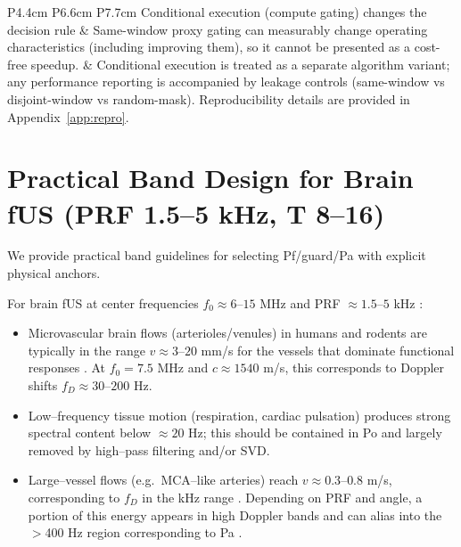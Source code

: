 \documentclass[11pt]{article}
\newif\ifSTAPPAPERONLY
\newcommand{\SuppOrApp}[1]{\ifSTAPPAPERONLY Supplementary Material\else Appendix~\ref{#1}\fi}
\begin{document}
\begin{table}[t]
{\begin{tabular}{P{4.4cm} P{6.6cm} P{7.7cm}}
Conditional execution (compute gating) changes the decision rule & Same-window proxy gating can measurably change operating characteristics (including improving them), so it cannot be presented as a cost-free speedup. & Conditional execution is treated as a separate algorithm variant; any performance reporting is accompanied by leakage controls (same-window vs disjoint-window vs random-mask). Reproducibility details are provided in \SuppOrApp{app:repro}. \\
\hline
\end{tabular}
}
\caption{Practical safeguards and audit checks. Each check is deterministic and label-free; it either records provenance/QC metrics or forces conservative penalty-layer behavior (e.g.\ $\phi_i\in\mathcal{R}_0$, $w\equiv 1$) with an explicit reason label.}
\label{tab:failure_modes_sentinels}
\end{table}

\section{Practical Band Design for Brain fUS (PRF 1.5--5 kHz, T 8--16)}
\label{sec:band-geometry}

We provide practical band guidelines for selecting Pf/guard/Pa with explicit physical anchors.

For brain fUS at center frequencies $f_0 \approx 6$--$15$ MHz and PRF $\approx 1.5$--$5$ kHz \cite{Mace2013,Rabut2020,Imbault2017,Urban2022,Deffieux2021}:

\begin{itemize}[nosep]
  \item Microvascular brain flows (arterioles/venules) in humans and rodents are typically in the range $v \approx 3$--$20$ mm/s for the vessels that dominate functional responses \cite{Imbault2017,Urban2022}. At $f_0=7.5$ MHz and $c\approx 1540$ m/s, this corresponds to Doppler shifts $f_D\approx 30$--$200$ Hz.
  \item Low--frequency tissue motion (respiration, cardiac pulsation) produces strong spectral content below $\approx 20$ Hz; this should be contained in Po and largely removed by high--pass filtering and/or SVD.
  \item Large--vessel flows (e.g.\ MCA--like arteries) reach $v\approx 0.3$--$0.8$ m/s, corresponding to $f_D$ in the kHz range \cite{TCDVelocities,TCDOptimalFlow}. Depending on PRF and angle, a portion of this energy appears in high Doppler bands and can alias into the $>$400 Hz region corresponding to Pa \cite{ICDFUS2021,MobileFUS2025}.
\end{itemize}
\end{document}
